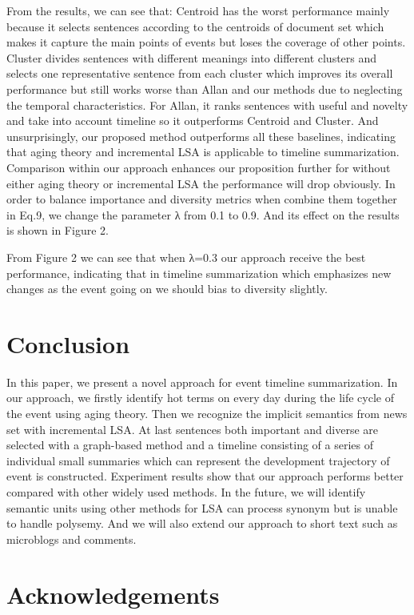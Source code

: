 \documentclass[runningheads,a4paper]{llncs}
\begin{document}
From the results, we can see that:
Centroid has the worst performance mainly because it selects sentences according to the centroids of document set which makes it capture the main points of events but loses the coverage of other points. Cluster divides sentences with different meanings into different clusters and selects one representative sentence from each cluster which improves its overall performance but still works worse than Allan and our methods due to neglecting the temporal characteristics. For Allan, it ranks sentences with useful and novelty and take into account timeline so it outperforms Centroid and Cluster. And unsurprisingly, our proposed method outperforms all these baselines, indicating that aging theory and incremental LSA is applicable to timeline summarization. Comparison within our approach enhances our proposition further for without either aging theory or incremental LSA the performance will drop obviously.
In order to balance importance and diversity metrics when combine them together in Eq.9, we change the parameter λ from 0.1 to 0.9. And its effect on the results is shown in Figure 2.


From Figure 2 we can see that when λ=0.3 our approach receive the best performance, indicating that in timeline summarization which emphasizes new changes as the event going on we should bias to diversity slightly.

\section{Conclusion}
In this paper, we present a novel approach for event timeline summarization. In our approach, we firstly identify hot terms on every day during the life cycle of the event using aging theory. Then we recognize the implicit semantics from news set with incremental LSA. At last sentences both important and diverse are selected with a graph-based method and a timeline consisting of a series of individual small summaries which can represent the development trajectory of event is constructed. Experiment results show that our approach performs better compared with other widely used methods.
In the future, we will identify semantic units using other methods for LSA can process synonym but is unable to handle polysemy. And we will also extend our approach to short text such as microblogs and comments.

\section{Acknowledgements}



\end{document}

